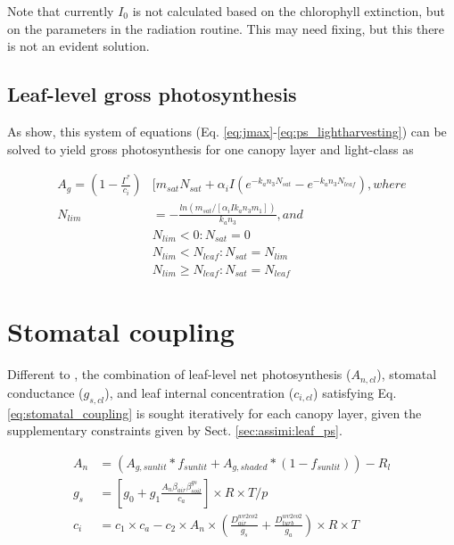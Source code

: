 Note that currently $I_{0}$ is not calculated based on the chlorophyll extinction, but on the parameters in the radiation routine. This may need fixing, but this there is not an evident solution.

\subsection{Leaf-level gross photosynthesis}

As \cite{Kull:1998cr} show, this system of equations (Eq. \ref{eq:jmax}-\ref{eq:ps_lightharvesting}) can be solved to yield gross photosynthesis for one canopy layer and light-class as 

\begin{subequations}
\begin{align}
A _g = (1-\frac{\Gamma^{*}}{c_i}) &[m_{sat}N_{sat}+\alpha_i I (e^{-k_a n_3 N_{sat}}-e^{-k_a n_3 N_{leaf}}), where\\
N_{lim} &=  - \frac{ln(m_{sat}/[\alpha_i I k_a n_3 m_1])}{k_a n_3}, and \\
&N_{lim} < 0: N_{sat}=0\\
&N_{lim} < N_{leaf}: N_{sat}=N_{lim}\\
&N_{lim} \ge N_{leaf}: N_{sat}=N_{leaf}
\end{align} 
\end{subequations} 

\section{Stomatal coupling}\label{sec:assimi:stomatal_coupling}     

Different to \cite{Friend:2010je}, the combination of leaf-level net photosynthesis ($A_{n,cl}$), stomatal conductance ($g_{s,cl}$), and leaf internal  concentration ($c_{i,cl}$) satisfying Eq. \ref{eq:stomatal_coupling} is sought iteratively for each canopy layer, given the supplementary constraints given by Sect. \ref{sec:assimi:leaf_ps}.

\begin{subequations}\label{eq:stomatal_coupling}
\begin{align}
A_n &= (A_{g,sunlit} * f_{sunlit} + A_{g,shaded} * (1- f_{sunlit})) - R_l\\
g_s &= [g_0 + g_1 \frac{A_n\beta_{air}\beta_{soil}^{gs}}{c_a}] \times R  \times T / p\\
c_i &= c_1 \times c_a - c_2 \times A_n \times ( \frac{D_{air}^{wv2co2}}{g_s} + \frac{D_{turb}^{wv2co2}}{g_a} ) \times R \times T 
\end{align} 
\end{subequations} 

